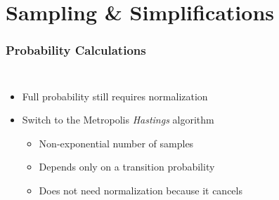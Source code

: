 \section{Sampling \& Simplifications}
    \begin{frame}[t]
        \frametitle{Probability Calculations}
        
        \vspace{-0.6cm}

        \begin{columns}[t]
                \begin{itemize}
                    \item Full probability still requires normalization \pause
                    \item Switch to the Metropolis \emph{Hastings} algorithm
                    \begin{itemize}
                        \item Non-exponential number of samples \pause
                        \item Depends only on a transition probability
                        \item Does not need normalization because it cancels
                    \end{itemize}
                \end{itemize}
    
            \onslide
                \vspace{0.0cm}
                \pause[3]
    
        \end{columns}

        \pause[2]
        \vspace{0.15cm}

        \onslide %
    \end{frame}

